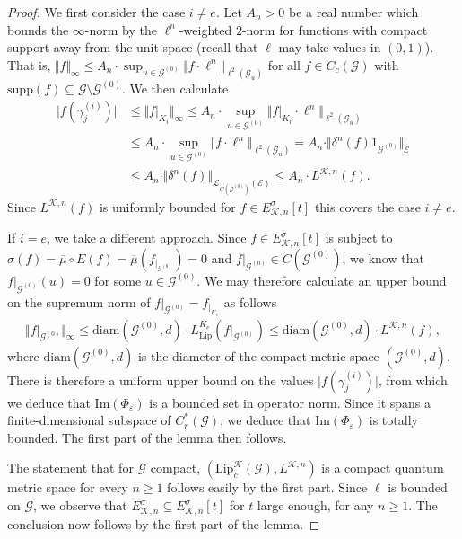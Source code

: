 \documentclass[11pt,a4paper,oneside,final,reqno]{amsart}
\theoremstyle{definition}
\newcommand{\G}{\mathcal{G}}
\newcommand{\Go}{\mathcal{G}^{(0)}}
\newcommand{\E}{\mathcal{E}}
\newcommand{\cK}{\mathcal{K}}
\newcommand{\curlyL}{\mathcal{L}}
\newcommand{\supp}{\mathrm{supp}}
\newcommand{\Ima}{\mathrm{Im}}
\newcommand{\Lip}{\mathrm{Lip}}
\newcommand{\Cred}{C_{r}^{*}}
\numberwithin{equation}{section}
\begin{document}
\begin{proof}
		
		We first consider the case $i \neq e$. Let $A_n > 0$ be a real number which bounds the $\infty$-norm by the $\ell^n$-weighted $2$-norm for functions with compact support away from the unit space (recall that $\ell$ may take values in $(0,1)$). That is, $\Vert f \Vert_\infty \leq A_n \cdot \sup_{u\in \Go} \Vert f \cdot \ell^n \Vert_{\ell^2(\G_u)}$ for all $f \in C_c (\G)$ with $\supp(f) \subseteq \G \setminus \Go$.  
		We then calculate 
		\begin{align*}
			\vert f(\gamma_j^{(i)}) \vert &\leq \Vert f\vert_{K_i} \Vert_\infty \leq A_n \cdot \sup_{u \in \Go} \Vert f\vert_{K_i} \cdot \ell^n \Vert_{\ell^2(\G_u)} \\
			&\leq A_n \cdot \sup_{u \in \Go} \Vert f \cdot \ell^n \Vert_{\ell^2(\G_u)}
			= A_n \cdot \Vert \delta^n (f) 1_{\Go} \Vert_{\E} \\
			&\leq A_n\cdot \Vert \delta^n(f) \Vert_{\curlyL_{C(\Go)}(\E)} 
			\leq A_n \cdot L^{\cK,n}(f). 
		\end{align*}  
		Since  $L^{\cK,n}(f)$ is uniformly bounded for 
		$f \in E^\sigma_{\cK,n}[t]$
		this covers the case $i \neq e$.
		
		If $i=e$, we take a different approach. Since 
		$f \in E^\sigma_{\cK,n}[t]$
		is subject to 
		$\sigma(f) = \overline{\mu} \circ E(f) = \overline{\mu}(f_{\vert_{\Go}}) = 0$ 
		and $f\vert_{\Go} \in C(\Go)$, we know that $f\vert_{\Go}(u) = 0$ for some $u \in \Go$. We may therefore calculate an upper bound on the supremum norm of $f\vert_{\Go} = f_{\vert_{K_e}}$ as follows
		\begin{align*}
			\Vert f\vert_{\Go} \Vert_\infty \leq \mathrm{diam}(\Go, d) \cdot L^{K_e}_{\mathrm{Lip}}(f \vert_{\Go}) \leq \mathrm{diam}(\Go, d)  \cdot L^{\cK, n}(f),
		\end{align*} 
		where $\mathrm{diam}(\Go, d)$ is the diameter of the compact metric space $(\Go, d)$. 
		There is therefore a uniform upper bound on the values $\vert f (\gamma_j^{(i)}) \vert $, from which we deduce that $\Ima( \Phi_\varepsilon)$ is a bounded set in operator norm. Since it spans a finite-dimensional subspace of $\Cred (\G)$, we deduce that $\Ima( \Phi_\varepsilon)$ is totally bounded. The first part of the lemma then follows. 
		
		The statement that for $\G$ compact, 
		$( \Lip_c^{\cK}(\G), L^{\cK, n})$
		is a compact quantum metric space for every $n \geq 1$ follows easily by the first part.  
		Since $\ell$ is bounded on $\G$, we observe that 
		$E^\sigma_{\cK, n} \subseteq E^\sigma_{\cK, n}[t]$
		for $t$ large enough, for any $n \geq 1$. The conclusion now follows by the first part of the lemma.
	\end{proof}
\end{document}
